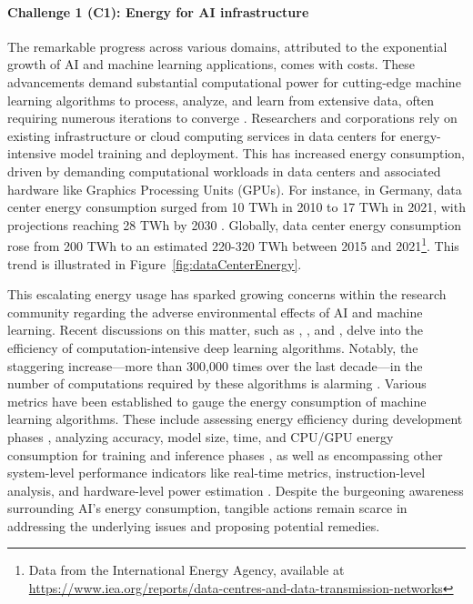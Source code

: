 \documentclass[12pt]{article}
\begin{document}
\paragraph*{\textbf{Challenge 1} (C1): Energy for AI infrastructure}
The remarkable progress across various domains, attributed to the exponential growth of AI and machine learning applications, comes with costs. These advancements demand substantial computational power for cutting-edge machine learning algorithms to process, analyze, and learn from extensive data, often requiring numerous iterations to converge \cite{Strubell2019EnergyPolicyConsiderations}. Researchers and corporations rely on existing infrastructure or cloud computing services in data centers for energy-intensive model training and deployment. This has increased energy consumption, driven by demanding computational workloads in data centers and associated hardware like Graphics Processing Units (GPUs). For instance, in Germany, data center energy consumption surged from 10 TWh in 2010 to 17 TWh in 2021, with projections reaching 28 TWh by 2030 \cite{Hintemann2022Cloudcomputingdrives}. Globally, data center energy consumption rose from 200 TWh to an estimated 220-320 TWh between 2015 and 2021\footnote{Data from the International Energy Agency, available at \url{https://www.iea.org/reports/data-centres-and-data-transmission-networks}}. This trend is illustrated in Figure~\ref{fig:dataCenterEnergy}.

This escalating energy usage has sparked growing concerns within the research community regarding the adverse environmental effects of AI and machine learning. Recent discussions on this matter, such as \cite{schwartz2019green}, \cite{vinuesa2020role}, and \cite{Strubell2019EnergyPolicyConsiderations}, delve into the efficiency of computation-intensive deep learning algorithms. Notably, the staggering increase---more than 300,000 times over the last decade---in the number of computations required by these algorithms is alarming \cite{schwartz2019green}. Various metrics have been established to gauge the energy consumption of machine learning algorithms. These include assessing energy efficiency during development phases \cite{zhou2020hulk}, analyzing accuracy, model size, time, and CPU/GPU energy consumption for training and inference phases \cite{Dalgren2019GreenMLA}, as well as encompassing other system-level performance indicators like real-time metrics, instruction-level analysis, and hardware-level power estimation \cite{garcia2019estimation}. Despite the burgeoning awareness surrounding AI's energy consumption, tangible actions remain scarce in addressing the underlying issues and proposing potential remedies.
\end{document}
